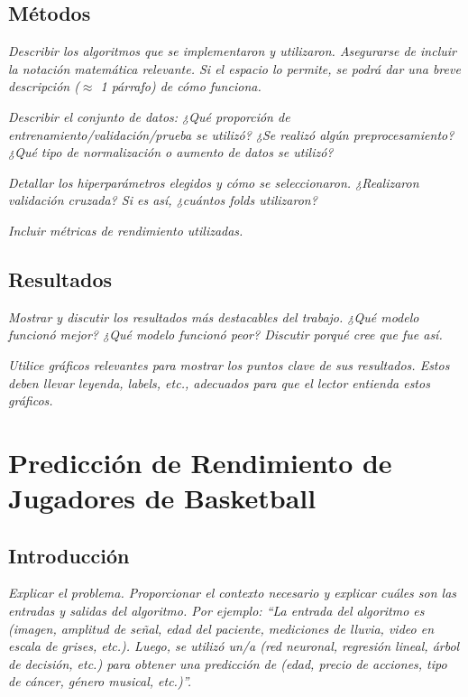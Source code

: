 \documentclass[11pt]{article}
\begin{document}
\subsection{Métodos}
\textit{Describir los algoritmos que se implementaron y utilizaron. Asegurarse de incluir la notación matemática relevante. Si el espacio lo permite, se podrá dar una breve descripción ($\approx$ 1 párrafo) de cómo funciona.}

\textit{Describir el conjunto de datos: ¿Qué proporción de entrenamiento/validación/prueba se utilizó? ¿Se realizó algún preprocesamiento? ¿Qué tipo de normalización o aumento de datos se utilizó?}

\textit{Detallar los hiperparámetros elegidos y cómo se seleccionaron. ¿Realizaron validación cruzada? Si es así, ¿cuántos folds utilizaron?}

\textit{Incluir métricas de rendimiento utilizadas.}

\subsection{Resultados}
\textit{Mostrar y discutir los resultados más destacables del trabajo. ¿Qué modelo funcionó mejor? ¿Qué modelo funcionó peor? Discutir porqué cree que fue así.}

\textit{Utilice gráficos relevantes para mostrar los puntos clave de sus resultados. Estos deben llevar leyenda, labels, etc., adecuados para que el lector entienda estos gráficos.}

\section{Predicción de Rendimiento de Jugadores de Basketball}
\begin{abstract}
Breve resumen (unas líneas) de qué se hizo, cómo se hizo, qué resultados se obtuvieron. Por ejemplo: ``En este trabajo se quizo modelar... Para llevarlo a cabo, se desarrolló ... se probó utilizando ... . El modelo performó ... y las métricas dieron ...''.
\end{abstract}

\subsection{Introducción}
\textit{Explicar el problema. Proporcionar el contexto necesario y explicar cuáles son las entradas y salidas del algoritmo. Por ejemplo: “La entrada del algoritmo es (imagen, amplitud de señal, edad del paciente, mediciones de lluvia, video en escala de grises, etc.). Luego, se utilizó un/a (red neuronal, regresión lineal, árbol de decisión, etc.) para obtener una predicción de (edad, precio de acciones, tipo de cáncer, género musical, etc.)”.}
\end{document}
